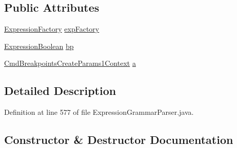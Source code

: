 \subsection*{Public Attributes}
\begin{DoxyCompactItemize}
\item 
\hyperlink{classgov_1_1nasa_1_1jpf_1_1inspector_1_1server_1_1expression_1_1_expression_factory}{Expression\+Factory} \hyperlink{classgov_1_1nasa_1_1jpf_1_1inspector_1_1server_1_1expression_1_1parser_1_1_expression_grammar_pa40092569cc5b197b7a5caae27da04e05_a793e80f9b9fc9776ffe215c2b57b09c5}{exp\+Factory}
\item 
\hyperlink{classgov_1_1nasa_1_1jpf_1_1inspector_1_1server_1_1expression_1_1_expression_boolean}{Expression\+Boolean} \hyperlink{classgov_1_1nasa_1_1jpf_1_1inspector_1_1server_1_1expression_1_1parser_1_1_expression_grammar_pa40092569cc5b197b7a5caae27da04e05_a816b6582796d22fcbc57626c974cfc84}{bp}
\item 
\hyperlink{classgov_1_1nasa_1_1jpf_1_1inspector_1_1server_1_1expression_1_1parser_1_1_expression_grammar_pa96543943a9acc7eb3cd37320a4fc3ee4}{Cmd\+Breakpoints\+Create\+Params1\+Context} \hyperlink{classgov_1_1nasa_1_1jpf_1_1inspector_1_1server_1_1expression_1_1parser_1_1_expression_grammar_pa40092569cc5b197b7a5caae27da04e05_a1bf464421f5f0c3792c4f70d92f854eb}{a}
\end{DoxyCompactItemize}


\subsection{Detailed Description}


Definition at line 577 of file Expression\+Grammar\+Parser.\+java.



\subsection{Constructor \& Destructor Documentation}

